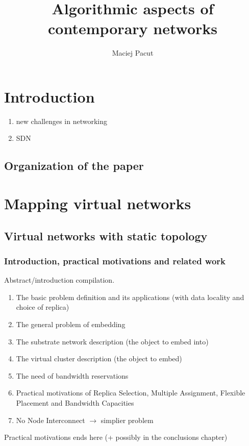 \documentclass[a4paper]{article}
\title{Algorithmic aspects of contemporary networks}
\author{Maciej Pacut}
\begin{document}
\maketitle

\section{Introduction}
\begin{enumerate}
  \item new challenges in networking
  \item SDN
\end{enumerate}

\subsection{Organization of the paper}

\section{Mapping virtual networks}

\subsection{Virtual networks with static topology}

\subsubsection{Introduction, practical motivations and related work}
Abstract/introduction compilation.
\begin{enumerate}
  \item The basic problem definition and its applications (with data locality and choice of replica)
  \item The general problem of embedding
  \item The substrate network description (the object to embed into)
  \item The virtual cluster description (the object to embed)
  \item The need of bandwidth reservations
  \item Practical motivations of Replica Selection, Multiple Assignment, Flexible Placement and Bandwidth Capacities
  \item No Node Interconnect $\rightarrow$ simplier problem
\end{enumerate}
Practical motivations ends here (+ possibly in the conclusions chapter)
\end{document}
